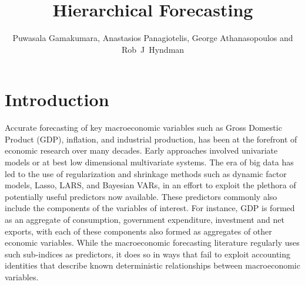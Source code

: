 \documentclass[graybox]{svmult}
\begin{document}
\title*{Hierarchical Forecasting}
\author{Puwasala Gamakumara, Anastasios Panagiotelis, George Athanasopoulos and Rob~J~Hyndman}
%
%
\maketitle

\section{Introduction}\label{sec:intro}

Accurate forecasting of key macroeconomic variables such as Gross Domestic Product (GDP), inflation, and industrial production, has been at the forefront of economic research over many decades. Early approaches involved univariate models or at best low dimensional multivariate systems. The era of big data has led to the use of regularization and shrinkage methods such as dynamic factor models, Lasso, LARS, and Bayesian VARs, in an effort to exploit the plethora of potentially useful predictors now available. These predictors commonly also include the components of the variables of interest. For instance, GDP is formed as an aggregate of consumption, government expenditure, investment and net exports, with each of these components also formed as aggregates of other economic variables. While the macroeconomic forecasting literature regularly uses such sub-indices as predictors, it does so in ways that fail to exploit accounting identities that describe known deterministic relationships between macroeconomic variables.
\end{document}
